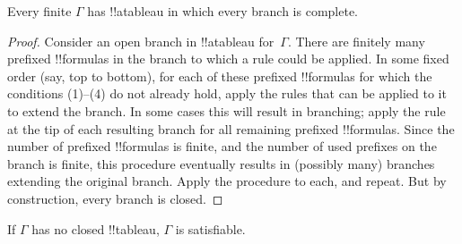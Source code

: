 \documentclass[../../../include/open-logic-section]{subfiles}
\begin{document}
\begin{prop}
  Every finite $\Gamma$ has !!a{tableau} in which every branch is complete.
\end{prop}

\begin{proof}
  Consider an open branch in !!a{tableau} for~$\Gamma$. There are
  finitely many prefixed !!{formula}s in the branch to which a rule
  could be applied. In some fixed order (say, top to bottom), for each
  of these prefixed !!{formula}s for which the conditions (1)--(4) do
  not already hold, apply the rules that can be applied to it to
  extend the branch. In some cases this will result in branching;
  apply the rule at the tip of each resulting branch for all remaining
  prefixed !!{formula}s. Since the number of prefixed !!{formula}s is
  finite, and the number of used prefixes on the branch is finite,
  this procedure eventually results in (possibly many) branches
  extending the original branch. Apply the procedure to each, and
  repeat. But by construction, every branch is closed.
\end{proof}

\begin{thm}[Completeness]
  If $\Gamma$ has no closed !!{tableau}, $\Gamma$ is satisfiable.
\end{thm}
\end{document}
